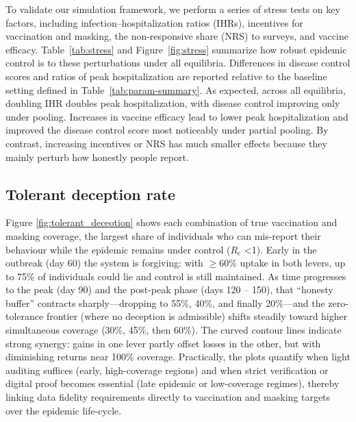 \documentclass[sigconf,review]{acmart}
\begin{document}
To validate our simulation framework, we perform a series of stress tests on key factors, including infection–hospitalization ratios (IHRs), incentives for vaccination and masking, the non-responsive share (NRS) to surveys, and vaccine efficacy. Table~\ref{tab:stress} and Figure~\ref{fig:stress} summarize how robust epidemic control is to these perturbations under all equilibria. Differences in disease control scores and ratios of peak hospitalization are reported relative to the baseline setting defined in Table~\ref{tab:param-summary}. As expected, across all equilibria, doubling IHR doubles peak hospitalization, with disease control improving only under pooling. Increases in vaccine efficacy lead to lower peak hospitalization and improved the disease control score most noticeably under partial pooling. By contrast, increasing incentives or NRS has much smaller effects because they mainly perturb how honestly people report. %


\subsection{Tolerant deception rate}

Figure \ref{fig:tolerant_deceotion} shows each combination of true vaccination and masking coverage, the largest share of individuals who can mis-report their behaviour while the epidemic remains under control ($R_c$ \textless 1). Early in the outbreak (day 60) the system is forgiving: with $\ge$60\% uptake in both levers, up to 75\% of individuals could lie and control is still maintained. As time progresses to the peak (day 90) and the post-peak phase (days 120 – 150), that “honesty buffer” contracts sharply—dropping to 55\%, 40\%, and finally 20\%—and the zero-tolerance frontier (where no deception is admissible) shifts steadily toward higher simultaneous coverage (30\%, 45\%, then 60\%). The curved contour lines indicate strong synergy: gains in one lever partly offset losses in the other, but with diminishing returns near 100\% coverage. Practically, the plots quantify when light auditing suffices (early, high-coverage regions) and when strict verification or digital proof becomes essential (late epidemic or low-coverage regimes), thereby linking data fidelity requirements directly to vaccination and masking targets over the epidemic life-cycle.
\end{document}
